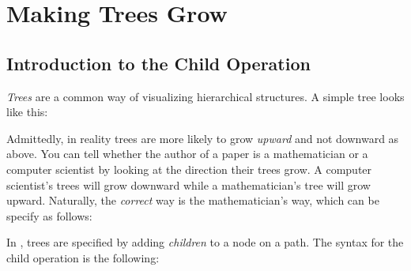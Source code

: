%


\section{Making Trees Grow}

\label{section-trees}


\subsection{Introduction to the  Child Operation}

\emph{Trees} are a common way of visualizing hierarchical
structures. A simple tree looks like this:
\begin{codeexample}[]
\end{codeexample}

Admittedly, in reality trees are more likely to grow \emph{upward} and
not downward as above. You can tell whether the author of a paper is a
mathematician or a computer scientist by looking at the direction
their trees grow. A computer scientist's trees will grow downward
while a mathematician's tree will grow upward. Naturally, the
\emph{correct} way is the mathematician's way, which can be specify as
follows: 
\begin{codeexample}[]
\end{codeexample}

In \tikzname, trees are specified by adding \emph{children} to a
node on a path. The syntax for the child operation is the following:

